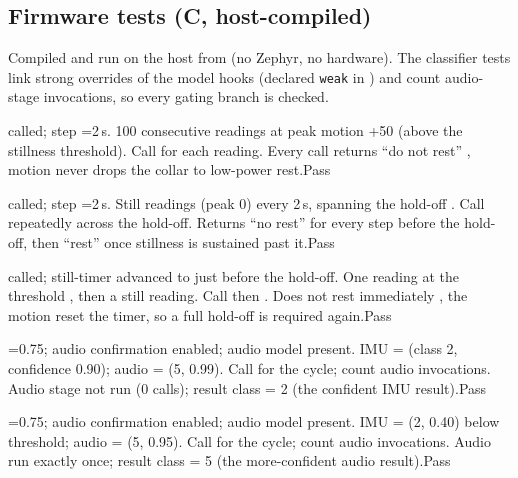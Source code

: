 \subsection{Firmware tests (C, host-compiled)}

Compiled and run on the host from  (no Zephyr, no hardware). The classifier tests
link strong overrides of the model hooks (declared \texttt{weak} in ) and count
audio-stage invocations, so every gating branch is checked.

{ called; step =2\,s.}
{100 consecutive readings at peak motion +50 (above the stillness threshold).}
{Call  for each reading.}
{Every call returns ``do not rest'' , motion never drops the collar to low-power rest.}{Pass}

{ called; step =2\,s.}
{Still readings (peak 0) every 2\,s, spanning the hold-off .}
{Call  repeatedly across the hold-off.}
{Returns ``no rest'' for every step before the hold-off, then ``rest'' once stillness is sustained past it.}{Pass}

{ called; still-timer advanced to just before the hold-off.}
{One reading at the threshold , then a still reading.}
{Call  then .}
{Does not rest immediately , the motion reset the timer, so a full hold-off is required again.}{Pass}

{=0.75; audio confirmation enabled; audio model present.}
{IMU = (class 2, confidence 0.90); audio = (5, 0.99).}
{Call  for the cycle; count audio invocations.}
{Audio stage not run (0 calls); result class = 2 (the confident IMU result).}{Pass}

{=0.75; audio confirmation enabled; audio model present.}
{IMU = (2, 0.40) below threshold; audio = (5, 0.95).}
{Call  for the cycle; count audio invocations.}
{Audio run exactly once; result class = 5 (the more-confident audio result).}{Pass}

